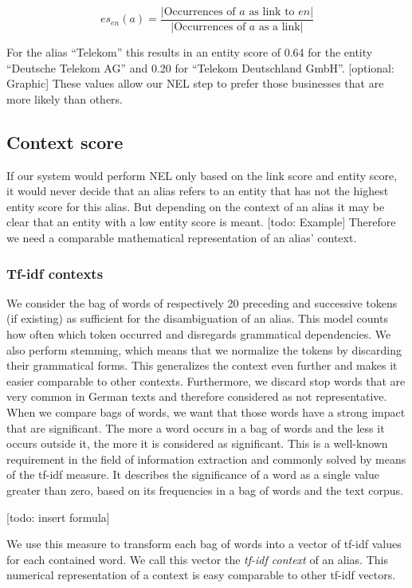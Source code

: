 \begin{equation*}
es_{en}(a) = \frac{|\text{Occurrences of $a$ as link to $en$}|}{|\text{Occurrences of $a$ as a link}|}
\end{equation*}

For the alias "`Telekom"' this results in an entity score of 0.64 for the entity "`Deutsche Telekom AG"' and 0.20 for "`Telekom Deutschland GmbH"'. [optional: Graphic] These values allow our NEL step to prefer those businesses that are more likely than others.\\


\subsection{Context score}
\label{sec:context_score}
If our system would perform NEL only based on the link score and entity score, it would never decide that an alias refers to an entity that has not the highest entity score for this alias. But depending on the context of an alias it may be clear that an entity with a low entity score is meant. [todo: Example] Therefore we need a comparable mathematical representation of an alias' context.


\subsubsection{Tf-idf contexts}
We consider the bag of words of respectively 20 preceding and successive tokens (if existing) as sufficient for the disambiguation of an alias. This model counts how often which token occurred and disregards grammatical dependencies. We also perform stemming, which means that we normalize the tokens by discarding their grammatical forms. This generalizes the context even further and makes it easier comparable to other contexts. Furthermore, we discard stop words that are very common in German texts and therefore considered as not representative. When we compare bags of words, we want that those words have a strong impact that are significant. The more a word occurs in a bag of words and the less it occurs outside it, the more it is considered as significant. This is a well-known requirement in the field of information extraction and commonly solved by means of the tf-idf measure. It describes the significance of a word as a single value greater than zero, based on its frequencies in a bag of words and the text corpus.

[todo: insert formula]

We use this measure to transform each bag of words into a vector of tf-idf values for each contained word. We call this vector the \textit{tf-idf context} of an alias. This numerical representation of a context is easy comparable to other tf-idf vectors.


